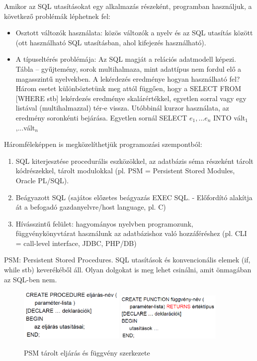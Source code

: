 \documentclass[margin=0px]{article}
\begin{document}
Amikor az SQL utasításokat egy alkalmazás részeként, programban használjuk, a következő problémák léphetnek fel:
\begin{itemize}
    \item Osztott változók használata: közös változók a nyelv és az SQL utasítás között (ott használható SQL utasításban, ahol kifejezés használható).
    \item A típuseltérés problémája: Az SQL magját a relációs adatmodell képezi. Tábla – gyűjtemény, sorok multihalmaza, mint adattípus nem fordul elő a magasszintű nyelvekben. A lekérdezés eredménye hogyan használható fel? Három esetet különböztetünk meg attól függően, hogy a SELECT FROM [WHERE stb] lekérdezés eredménye skalárértékkel, egyetlen sorral vagy egy listával (multihalmazzal) tér-e vissza. Utóbbinál kurzor használata, az eredmény soronkénti bejárása. Egyetlen sornál SELECT $e_1,...e_n$ INTO vált$_1$,...vált$_n$
\end{itemize}
Háromféleképpen is megközelíthetjük programozási szempontból:
\begin{enumerate}
    \item SQL kiterjesztése procedurális eszközökkel, az adatbázis séma részeként tárolt kódrészekkel, tárolt modulokkal (pl. PSM = Persistent Stored Modules, Oracle PL/SQL).
    \item Beágyazott SQL (sajátos előzetes beágyazás EXEC SQL. - Előfordító alakítja át a befogadó gazdanyelvre/host language, pl. C)
    \item Hívásszintű felület: hagyományos nyelvben programozunk, függvénykönyvtárat használunk az adatbázishoz való hozzáféréshez (pl. CLI = call-level interface, JDBC, PHP/DB)
\end{enumerate}
PSM: Persistent Stored Procedures. SQL utasítások és konvencionális elemek (if, while stb) keverékéből áll. Olyan dolgokat is meg lehet csinálni, amit önmagában az SQL-ben nem.
\begin{figure}[H]
    \centering
    \includegraphics[width=0.45\textwidth]{img/psm1.png}
    \includegraphics[width=0.45\textwidth]{img/psm2.png}
    \caption{PSM tárolt eljárás és függvény szerkezete}
\end{figure}
\end{document}
